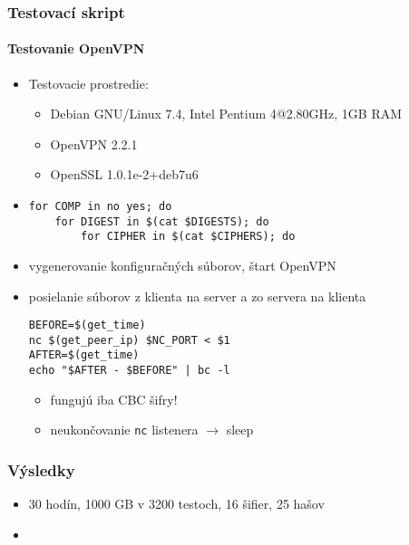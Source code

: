 \documentclass{beamer}
\begin{document}
\begin{frame}[fragile]
	\frametitle{Testovací skript}
	\framesubtitle{Testovanie OpenVPN}
	\begin{itemize}
		\item Testovacie prostredie:
			\begin{itemize}
				\item Debian GNU/Linux 7.4, Intel Pentium 4@2.80GHz, 1GB RAM
				\item OpenVPN 2.2.1
				\item OpenSSL 1.0.1e-2+deb7u6
			\end{itemize}
		\item
{\small
\begin{verbatim}
for COMP in no yes; do
    for DIGEST in $(cat $DIGESTS); do
        for CIPHER in $(cat $CIPHERS); do
\end{verbatim}
}
		\item vygenerovanie konfiguračných súborov, štart OpenVPN
		\item posielanie súborov z klienta na server a zo servera na klienta
{\tiny
\begin{verbatim}
BEFORE=$(get_time)
nc $(get_peer_ip) $NC_PORT < $1
AFTER=$(get_time)
echo "$AFTER - $BEFORE" | bc -l
\end{verbatim}
}
			\begin{itemize} 
				\item fungujú iba CBC šifry!
				\item neukončovanie \texttt{nc} listenera $\rightarrow$ sleep
			\end{itemize}	

	\end{itemize}
\end{frame}

\begin{frame}
	\frametitle{Výsledky}
	\begin{itemize}
		\item 30 hodín, 1000 GB v 3200 testoch, 16 šifier, 25 hašov
		\item 
	\end{itemize}
\end{frame}

\end{document}

